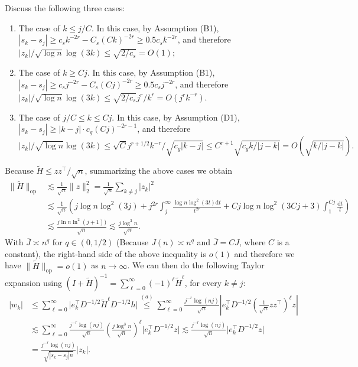 \documentclass[aos]{imsart}
\renewcommand{\tilde}{\widetilde}
\renewcommand{\bar}{\overline}
\newcommand{\op}{\mathrm{op}}
\newcommand{\ud}{\mathrm d}
\theoremstyle{plain}
\theoremstyle{definition}
\theoremstyle{definition}
\begin{document}
\begin{appendix}
Discuss the following three cases:
\begin{enumerate}
\item The case of $k\leq j/C$. In this case, by Assumption (B1), $|s_k-s_j|\geq c_s k^{-2r} - C_s(Ck)^{-2r}\geq 0.5c_sk^{-2r}$, and therefore $|z_k|/\sqrt{\log n}\log(3k)\leq \sqrt{2/c_s}=O(1)$;
\item The case of $k\geq Cj$. In this case, by Assumption (B1), $|s_k-s_j| \geq c_s j^{-2r} - C_s (Cj)^{-2r}\geq 0.5c_s j^{-2r}$, and therefore $|z_k|/\sqrt{\log n}\log(3k)\leq \sqrt{2/c_s}j^r/k^r= O(j^rk^{-r})$.
\item The case of $j/C\leq k\leq Cj$. In this case, by Assumption (D1), $|s_k-s_j| \geq |k-j| \cdot c_g(Cj)^{-2r-1}$, and therefore 
$$
|z_k|/\sqrt{\log n}\log(3k)\leq \sqrt{C}j^{r+1/2}k^{-r}/\sqrt{c_g|k-j|}\leq C^{r+1}\sqrt{c_gk/|j-k|}= O(\sqrt{k/|j-k|}).
$$
\end{enumerate}
Because $\tilde H \leq zz^\top/\sqrt{n}$, summarizing the above cases we obtain 
\begin{align}
\|\tilde H\|_\op&\lesssim \frac{1}{\sqrt{n}}\|z\|_2^2 =\frac{1}{\sqrt{n}}\sum_{k\neq j}|z_k|^2 \nonumber\\
& \lesssim \frac{1}{\sqrt{n}}\left(j\log n\log^2(3j) + j^{2r}\int_j^{\infty}\frac{\log n\log^2 (3t)\ud t}{t^{2r}} + Cj\log n\log^2 (3Cj+3)\int_1^{Cj} \frac{\ud t}{t}\right)\nonumber\\
& \lesssim \frac{j\ln n\ln^2 (j+1))}{\sqrt{n}}\lesssim \frac{j\log^3 n}{\sqrt{n}}.
\end{align}
With $\bar J\asymp n^q$ for $q\in(0,1/2)$ (Because $J(n)\asymp n^q$ and $\bar J=CJ$, where $C$ is a constant), the right-hand side of the above inequality is $o(1)$ and therefore we have $\|\tilde H\|_\op=o(1)$ as $n\to\infty$.
We can then do the following Taylor expansion using $(I+\tilde H)^{-1} = \sum_{\ell=0}^{\infty} (-1)^\ell \tilde H^\ell$, for every $k\neq j$:
\begin{align}
|w_k| &\leq \sum_{\ell=0}^{\infty} \big|e_k^\top D^{-1/2}\tilde H^\ell D^{-1/2}h\big| \overset{(a)}{\leq }\sum_{\ell=0}^{\infty} \frac{j^{-r}\log(nj)}{\sqrt{n}}\left|e_k^\top D^{-1/2}\left(\frac{1}{\sqrt{n}}zz^\top\right)^\ell z\right|\nonumber\\
&\lesssim \sum_{\ell=0}^{\infty}\frac{j^{-r}\log(nj)}{\sqrt{n}}\left(\frac{j\log^3 n}{\sqrt{n}}\right)^\ell \big|e_k^\top D^{-1/2}z\big| \lesssim\frac{j^{-r}\log(nj)}{\sqrt{n}}\big|e_k^\top D^{-1/2}z\big|\nonumber\\
& = \frac{j^{-r}\log (nj)}{\sqrt{|s_k-s_j| n}}\big|z_k\big|.\label{eq:proof-stability-4} 

\end{align}
\end{appendix}
\end{document}
